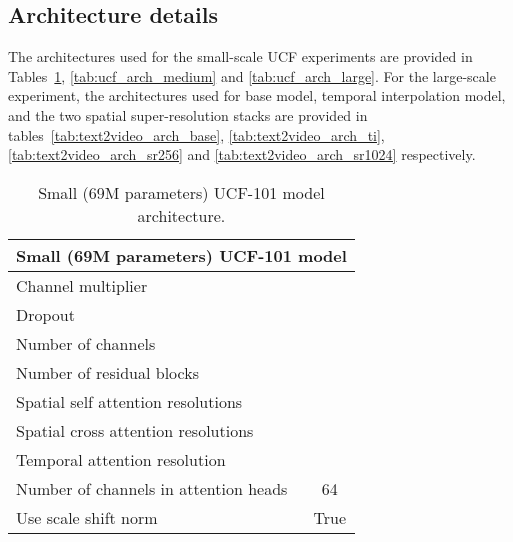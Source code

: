 \documentclass[10pt,twocolumn,letterpaper]{article}
\begin{document}
\subsection{Architecture details}
The architectures used for the small-scale UCF experiments are provided in Tables~\ref{tab:ucf_arch_small}, \ref{tab:ucf_arch_medium} and \ref{tab:ucf_arch_large}. For the large-scale experiment, the architectures used for base model, temporal interpolation model, and the two spatial super-resolution stacks are provided in tables~\ref{tab:text2video_arch_base}, \ref{tab:text2video_arch_ti}, \ref{tab:text2video_arch_sr256} and \ref{tab:text2video_arch_sr1024} respectively.


\label{sec:architecture_details}





\renewcommand{\arraystretch}{1}


\begin{table}[!ht]
    \centering
    \caption{Small (69M parameters) UCF-101 model architecture.}
    \vspace{-1mm}
    \label{tab:ucf_arch_small}
    \begin{tabular}{l c}
        \toprule
        \multicolumn{2}{c}{Small (69M parameters) UCF-101 model}\\
        \midrule
        Channel multiplier &  \\
        Dropout &  \\
        Number of channels &  \\
        Number of residual blocks &  \\
        Spatial self attention resolutions &  \\
        Spatial cross attention resolutions &  \\
        Temporal attention resolution &  \\
        Number of channels in attention heads & 64\\
        Use scale shift norm & True \\
        \bottomrule
    \end{tabular}
\end{table}
\end{document}
